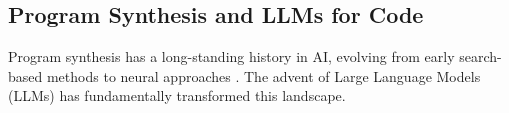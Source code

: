 \documentclass[11pt]{article}
\begin{document}
%
%
%
%
%
%
%
%
%
%
%
%

\subsection{Program Synthesis and LLMs for Code}
Program synthesis has a long-standing history in AI, evolving from early search-based methods \citep{manna1971toward, gulwani2011automating} to neural approaches \citep{feng2020codebert, ahmad2021unified}. The advent of Large Language Models (LLMs) has fundamentally transformed this landscape.
\end{document}
